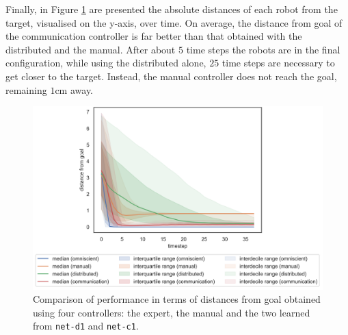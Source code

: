 Finally, in Figure \ref{fig:net-c1distance} are presented the absolute distances of 
each robot from the target, visualised on the y-axis, over time.
On average, the distance from goal of the communication controller is far better  
than that obtained with the distributed and the manual. After about $5$ time 
steps the robots are in the final configuration, while using the distributed 
alone, $25$ time steps are necessary to get closer to the target. Instead, the 
manual controller does not reach the goal, remaining $1$\gls{cm} away. 
\begin{figure}[!htb]
	\centering
	\includegraphics[width=.65\textwidth]{contents/images/net-c1/distances-from-goal-compressed-communication}%
	\caption[Evaluation of \texttt{net-c1} distances from goal.]{Comparison of 
		performance in terms of distances from goal obtained using four controllers: 
		the expert, the manual and the two learned from \texttt{net-d1} and 
		\texttt{net-c1}.}
	\label{fig:net-c1distance}
\end{figure}

